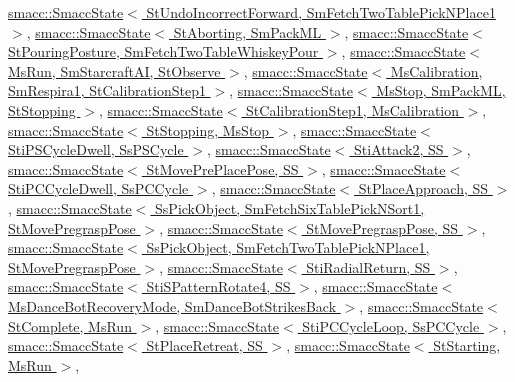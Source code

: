 \hyperlink{classsmacc_1_1SmaccState_afc39f8e0ca4001b2159a100da2fccd0e}{smacc\+::\+Smacc\+State$<$ St\+Undo\+Incorrect\+Forward, Sm\+Fetch\+Two\+Table\+Pick\+N\+Place1 $>$}, \hyperlink{classsmacc_1_1SmaccState_afc39f8e0ca4001b2159a100da2fccd0e}{smacc\+::\+Smacc\+State$<$ St\+Aborting, Sm\+Pack\+M\+L $>$}, \hyperlink{classsmacc_1_1SmaccState_afc39f8e0ca4001b2159a100da2fccd0e}{smacc\+::\+Smacc\+State$<$ St\+Pouring\+Posture, Sm\+Fetch\+Two\+Table\+Whiskey\+Pour $>$}, \hyperlink{classsmacc_1_1SmaccState_afc39f8e0ca4001b2159a100da2fccd0e}{smacc\+::\+Smacc\+State$<$ Ms\+Run, Sm\+Starcraft\+A\+I, St\+Observe $>$}, \hyperlink{classsmacc_1_1SmaccState_afc39f8e0ca4001b2159a100da2fccd0e}{smacc\+::\+Smacc\+State$<$ Ms\+Calibration, Sm\+Respira1, St\+Calibration\+Step1 $>$}, \hyperlink{classsmacc_1_1SmaccState_afc39f8e0ca4001b2159a100da2fccd0e}{smacc\+::\+Smacc\+State$<$ Ms\+Stop, Sm\+Pack\+M\+L, St\+Stopping $>$}, \hyperlink{classsmacc_1_1SmaccState_afc39f8e0ca4001b2159a100da2fccd0e}{smacc\+::\+Smacc\+State$<$ St\+Calibration\+Step1, Ms\+Calibration $>$}, \hyperlink{classsmacc_1_1SmaccState_afc39f8e0ca4001b2159a100da2fccd0e}{smacc\+::\+Smacc\+State$<$ St\+Stopping, Ms\+Stop $>$}, \hyperlink{classsmacc_1_1SmaccState_afc39f8e0ca4001b2159a100da2fccd0e}{smacc\+::\+Smacc\+State$<$ Sti\+P\+S\+Cycle\+Dwell, Ss\+P\+S\+Cycle $>$}, \hyperlink{classsmacc_1_1SmaccState_afc39f8e0ca4001b2159a100da2fccd0e}{smacc\+::\+Smacc\+State$<$ Sti\+Attack2, S\+S $>$}, \hyperlink{classsmacc_1_1SmaccState_afc39f8e0ca4001b2159a100da2fccd0e}{smacc\+::\+Smacc\+State$<$ St\+Move\+Pre\+Place\+Pose, S\+S $>$}, \hyperlink{classsmacc_1_1SmaccState_afc39f8e0ca4001b2159a100da2fccd0e}{smacc\+::\+Smacc\+State$<$ Sti\+P\+C\+Cycle\+Dwell, Ss\+P\+C\+Cycle $>$}, \hyperlink{classsmacc_1_1SmaccState_afc39f8e0ca4001b2159a100da2fccd0e}{smacc\+::\+Smacc\+State$<$ St\+Place\+Approach, S\+S $>$}, \hyperlink{classsmacc_1_1SmaccState_afc39f8e0ca4001b2159a100da2fccd0e}{smacc\+::\+Smacc\+State$<$ Ss\+Pick\+Object, Sm\+Fetch\+Six\+Table\+Pick\+N\+Sort1, St\+Move\+Pregrasp\+Pose $>$}, \hyperlink{classsmacc_1_1SmaccState_afc39f8e0ca4001b2159a100da2fccd0e}{smacc\+::\+Smacc\+State$<$ St\+Move\+Pregrasp\+Pose, S\+S $>$}, \hyperlink{classsmacc_1_1SmaccState_afc39f8e0ca4001b2159a100da2fccd0e}{smacc\+::\+Smacc\+State$<$ Ss\+Pick\+Object, Sm\+Fetch\+Two\+Table\+Pick\+N\+Place1, St\+Move\+Pregrasp\+Pose $>$}, \hyperlink{classsmacc_1_1SmaccState_afc39f8e0ca4001b2159a100da2fccd0e}{smacc\+::\+Smacc\+State$<$ Sti\+Radial\+Return, S\+S $>$}, \hyperlink{classsmacc_1_1SmaccState_afc39f8e0ca4001b2159a100da2fccd0e}{smacc\+::\+Smacc\+State$<$ Sti\+S\+Pattern\+Rotate4, S\+S $>$}, \hyperlink{classsmacc_1_1SmaccState_afc39f8e0ca4001b2159a100da2fccd0e}{smacc\+::\+Smacc\+State$<$ Ms\+Dance\+Bot\+Recovery\+Mode, Sm\+Dance\+Bot\+Strikes\+Back $>$}, \hyperlink{classsmacc_1_1SmaccState_afc39f8e0ca4001b2159a100da2fccd0e}{smacc\+::\+Smacc\+State$<$ St\+Complete, Ms\+Run $>$}, \hyperlink{classsmacc_1_1SmaccState_afc39f8e0ca4001b2159a100da2fccd0e}{smacc\+::\+Smacc\+State$<$ Sti\+P\+C\+Cycle\+Loop, Ss\+P\+C\+Cycle $>$}, \hyperlink{classsmacc_1_1SmaccState_afc39f8e0ca4001b2159a100da2fccd0e}{smacc\+::\+Smacc\+State$<$ St\+Place\+Retreat, S\+S $>$}, \hyperlink{classsmacc_1_1SmaccState_afc39f8e0ca4001b2159a100da2fccd0e}{smacc\+::\+Smacc\+State$<$ St\+Starting, Ms\+Run $>$}, 
